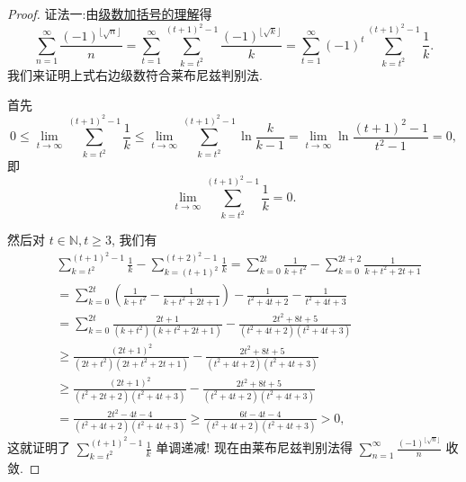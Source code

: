 \documentclass[../../main.tex]{subfiles}
\begin{document}
\begin{proof}
{\color{blue}证法一:}由\hyperref[theorem:级数加括号的理解]{级数加括号的理解}得
\[
\sum_{n=1}^{\infty}{\frac{(-1)^{\lfloor \sqrt{n} \rfloor}}{n}}=\sum_{t=1}^{\infty}{\sum_{k=t^2}^{(t+1)^2-1}{\frac{\left( -1 \right) ^{\lfloor \sqrt{k} \rfloor}}{k}}}=\sum_{t=1}^{\infty}{\left( -1 \right) ^t\sum_{k=t^2}^{(t+1)^2-1}{\frac{1}{k}}}.
\]
我们来证明上式右边级数符合莱布尼兹判别法.

首先
\[
0 \leqslant \lim_{t \to \infty} \sum_{k=t^2}^{(t + 1)^2 - 1} \frac{1}{k} \leqslant \lim_{t \to \infty} \sum_{k=t^2}^{(t + 1)^2 - 1} \ln \frac{k}{k - 1} = \lim_{t \to \infty} \ln \frac{(t + 1)^2 - 1}{t^2 - 1} = 0,
\]
即
\[
\lim_{t \to \infty} \sum_{k=t^2}^{(t + 1)^2 - 1} \frac{1}{k} = 0.
\]

然后对 $t \in \mathbb{N}, t \geqslant 3$, 我们有
\begin{align*}
&\sum_{k=t^2}^{(t + 1)^2 - 1} \frac{1}{k} - \sum_{k=(t + 1)^2}^{(t + 2)^2 - 1} \frac{1}{k} = \sum_{k=0}^{2t} \frac{1}{k + t^2} - \sum_{k=0}^{2t + 2} \frac{1}{k + t^2 + 2t + 1} \\
&= \sum_{k=0}^{2t} \left( \frac{1}{k + t^2} - \frac{1}{k + t^2 + 2t + 1} \right) - \frac{1}{t^2 + 4t + 2} - \frac{1}{t^2 + 4t + 3} \\
&= \sum_{k=0}^{2t} \frac{2t + 1}{(k + t^2)(k + t^2 + 2t + 1)} - \frac{2t^2 + 8t + 5}{(t^2 + 4t + 2)(t^2 + 4t + 3)} \\
& \geqslant \frac{(2t + 1)^2}{(2t + t^2)(2t + t^2 + 2t + 1)} - \frac{2t^2 + 8t + 5}{(t^2 + 4t + 2)(t^2 + 4t + 3)} \\
& \geqslant \frac{(2t + 1)^2}{(t^2 + 2t + 2)(t^2 + 4t + 3)} - \frac{2t^2 + 8t + 5}{(t^2 + 4t + 2)(t^2 + 4t + 3)} \\
&= \frac{2t^2 - 4t - 4}{(t^2 + 4t + 2)(t^2 + 4t + 3)} \geqslant \frac{6t - 4t - 4}{(t^2 + 4t + 2)(t^2 + 4t + 3)} > 0,
\end{align*}
这就证明了 $\sum_{k=t^2}^{(t + 1)^2 - 1} \frac{1}{k}$ 单调递减!
现在由莱布尼兹判别法得 $\sum_{n=1}^{\infty} \frac{(-1)^{\lfloor \sqrt{n} \rfloor}}{n}$ 收敛.


\end{proof}
\end{document}
